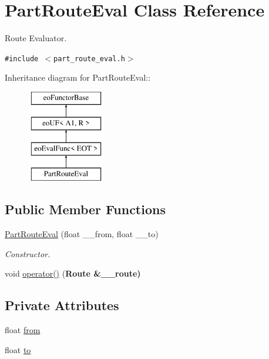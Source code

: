 \hypertarget{classPartRouteEval}{
\section{Part\-Route\-Eval Class Reference}
\label{classPartRouteEval}
}
Route Evaluator.  


{\tt \#include $<$part\_\-route\_\-eval.h$>$}

Inheritance diagram for Part\-Route\-Eval::\begin{figure}[H]
\begin{center}
\leavevmode
\includegraphics[height=4cm]{classPartRouteEval}
\end{center}
\end{figure}
\subsection*{Public Member Functions}
\begin{CompactItemize}
\item 
\hypertarget{classPartRouteEval_a331566b29bc3227f377004232f05491}{
\hyperlink{classPartRouteEval_a331566b29bc3227f377004232f05491}{Part\-Route\-Eval} (float \_\-\_\-from, float \_\-\_\-to)}
\label{classPartRouteEval_a331566b29bc3227f377004232f05491}

\begin{CompactList}\small\item\em Constructor. \item\end{CompactList}\item 
\hypertarget{classPartRouteEval_965fab875fb601f17934a6ece761beae}{
void \hyperlink{classPartRouteEval_965fab875fb601f17934a6ece761beae}{operator()} (\bf{Route} \&\_\-\_\-route)}
\label{classPartRouteEval_965fab875fb601f17934a6ece761beae}

\end{CompactItemize}
\subsection*{Private Attributes}
\begin{CompactItemize}
\item 
\hypertarget{classPartRouteEval_5bde722e66378b2570ae6c4b4f8df58e}{
float \hyperlink{classPartRouteEval_5bde722e66378b2570ae6c4b4f8df58e}{from}}
\label{classPartRouteEval_5bde722e66378b2570ae6c4b4f8df58e}

\item 
\hypertarget{classPartRouteEval_de53cc919faa498663f327b72c357da3}{
float \hyperlink{classPartRouteEval_de53cc919faa498663f327b72c357da3}{to}}
\label{classPartRouteEval_de53cc919faa498663f327b72c357da3}

\end{CompactItemize}



